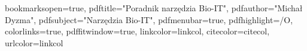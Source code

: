 


\usepackage{color}


\usepackage[a4paper,hyperindex=true]{hyperref} %

\hypersetup
{
bookmarksopen=true,
pdftitle="Poradnik narzędzia Bio-IT",
pdfauthor="Michał Dyzma", 
pdfsubject="Narzędzia Bio-IT", %
pdfmenubar=true, %
pdfhighlight=/O, %
colorlinks=true, %
pdffitwindow=true, %
linkcolor=linkcol, %
citecolor=citecol, %
urlcolor=linkcol %
}






\setcounter{secnumdepth}{3}
\setcounter{tocdepth}{3}

\usepackage[hmarginratio=1:1,margin=2cm]{geometry}



\titleformat{\section}{\large\bfseries\scshape}{\thesection}{1em}{} %

